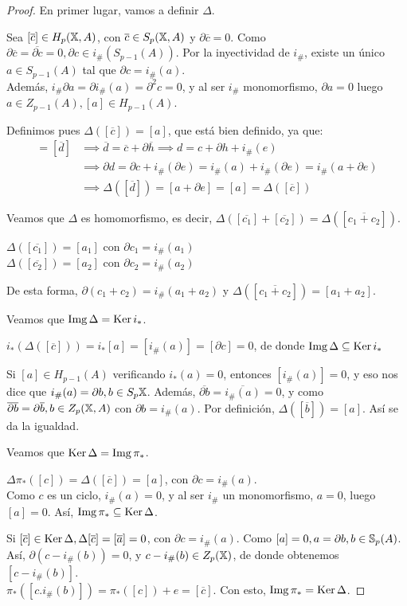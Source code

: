 \begin{proof}
  En primer lugar, vamos a definir $\Delta$.

  Sea $[\overline{c}] \in H_p(\X, A)$, con $\overline{c} \in S_p(\X, A)$ y $\partial \overline{c} = 0$. Como $\partial \overline{c} = \overline{\partial c} = 0,
  \partial c \in i_\#(S_{p-1}(A))$. Por la inyectividad de $i_\#$, existe un único $a \in S_{p-1}(A)$ tal que $\partial c = i_\#(a)$. \\
  Además, $i_\# \partial a = \partial i_\#(a) = \partial^2 c = 0$, y al ser $i_\#$ monomorfismo, $\partial a = 0$ luego $a \in Z_{p-1}(A), [a] \in H_{p-1}(A)$.

  Definimos pues $\Delta([\overline{c}]) = [a]$, que está bien definido, ya que:
  \begin{align*}
    [\overline{c}] = [\overline{d}] &\implies \overline{d} = \overline{c} + \partial \overline{h} \implies d = c + \partial h + i_\#(e) \\
    &\implies \partial d = \partial c + i_\#(\partial e) = i_\#(a) + i_\#(\partial e) = i_\#(a + \partial e) \\
    &\implies \Delta([\overline{d}]) = [a + \partial e] = [a] = \Delta([\overline{c}])
  \end{align*}

  Veamos que $\Delta$ es homomorfismo, es decir, $\Delta([\overline{c_1}] + [\overline{c_2}]) = \Delta([\overline{c_1 + c_2}])$.

  $\Delta([\overline{c_1}]) = [a_1]$ con $\partial c_1 = i_\#(a_1)$ \\
  $\Delta([\overline{c_2}]) = [a_2]$ con $\partial c_2 = i_\#(a_2)$

  De esta forma, $\partial(c_1 + c_2) = i_\#(a_1 + a_2)$ y $\Delta([\overline{c_1 + c_2}]) = [a_1 + a_2]$.

  Veamos que $\Img \Delta = \Ker i_*$.

  $i_*(\Delta([\overline{c}])) = i_*[a] = [i_\#(a)] = [\partial c] = 0$, de donde $\Img \Delta \subseteq \Ker i_*$

  Si $[a] \in H_{p-1}(A)$ verificando $i_*(a) = 0$, entonces $[i_\#(a)] = 0$, y eso nos dice que $i_\#(a) = \partial b, b \in S_p{\X}$.
  Además, $\overline{\partial b} = \overline{i_\#(a)} = 0$, y como $\overline{\partial b} = \partial \overline{b}, b \in Z_p(\X, A)$ con
  $\partial b = i_\#(a)$. Por definición, $\Delta([\overline{b}]) = [a]$. Así se da la igualdad.

  Veamos que $\Ker \Delta = \Img \pi_*$.

  $\Delta\pi_*([c]) = \Delta([\overline{c}]) = [a]$, con $\partial c = i_\#(a)$. \\
  Como $c$ es un ciclo, $i_\#(a) = 0$, y al ser $i_\#$ un monomorfismo, $a = 0$, luego $[a] = 0$. Así, $\Img \pi_* \subseteq \Ker \Delta$.

  Si $[\overline{c}] \in \Ker \Delta, \Delta[\overline{c}] = [\overline{a}] = 0$, con $\partial c = i_\#(a)$. Como $[a] = 0, a = \partial b, b \in \S_p(A)$.
  Así, $\partial(c - i_\#(b)) = 0$, y $c - i_\#(b) \in Z_p(\X)$, de donde obtenemos $[c - i_\#(b)]$. \\
  $\pi_*([c . i_\#(b)]) = \pi_*([c]) + e = [\overline{c}]$. Con esto, $\Img \pi_* = \Ker \Delta$.
\end{proof}

